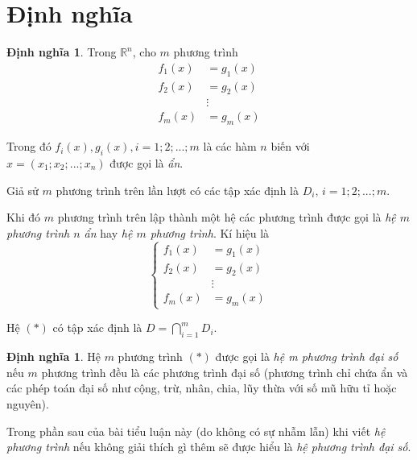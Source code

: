 \documentclass[12pt,a4paper,oneside]{book}
\theoremstyle{theorem}
\theoremstyle{definition}
\newtheorem{dn}[theorem2]{Định nghĩa}
\begin{document}
    \section{Định nghĩa}
    \begin{dn}
        Trong $\mathbb{R}^n$, cho $m$ phương trình
        \[
\begin{aligned}
f_1(x) &= g_1(x) \\
f_2(x) &= g_2(x) \\
&\vdots \\
f_m(x) &= g_m(x)
\end{aligned}
\]

Trong đó $f_i(x),g_i(x),i=1;2;...;m$ là các hàm $n$ biến với $x=(x_1;x_2;...;x_n)$ được gọi là \textit{ẩn}.

Giả sử $m$ phương trình trên lần lượt có các tập xác định là $D_i,\, i=1;2;...;m$.

Khi đó $m$ phương trình trên lập thành một hệ các phương trình được gọi là \textit{hệ $m$ phương trình $n$ ẩn} hay \textit{hệ $m$ phương trình}. Kí hiệu là
\[
\left\{
\begin{aligned}
f_1(x) &= g_1(x) \\
f_2(x) &= g_2(x) \\
&\vdots \\
f_m(x) &= g_m(x)
\end{aligned}
\right.
\tag{*}
\]

Hệ $(*)$ có tập xác định là $D=\bigcap_{i=1}^{m}{D_i}$.
    \end{dn}
    \begin{dn}
        Hệ $m$ phương trình $(*)$ được gọi là \textit{hệ m phương trình đại số} nếu $m$ phương trình đều là các phương trình đại số (phương trình chỉ chứa ẩn và các phép toán đại số như cộng, trừ, nhân, chia, lũy thừa với số mũ hữu tỉ hoặc nguyên).
    \end{dn}
 \newpage
    Trong phần sau của bài tiểu luận này (do không có sự nhẫm lẫn) khi viết \textit{hệ phương trình} nếu không giải thích gì thêm sẽ được hiểu là \textit{hệ phương trình đại số}.
  
\end{document}
